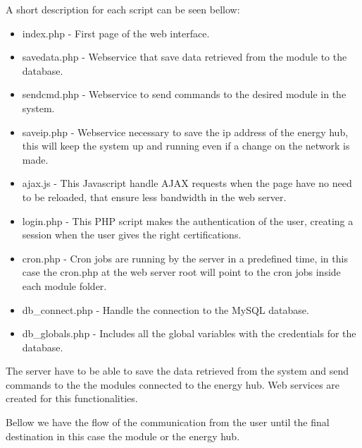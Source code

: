 A short description for each script can be seen bellow:
\begin{itemize}
	\item index.php - First page of the web interface.
	\item savedata.php - Webservice that save data retrieved from the module to the database.
	\item sendcmd.php - Webservice to send commands to the desired module in the system.
	\item saveip.php - Webservice necessary to save the ip address of the energy hub, this will keep the system up and running even if a change on the network is made.
	\item ajax.js - This Javascript handle AJAX requests when the page have no need to be reloaded, that ensure less bandwidth in the web server.
	\item login.php  - This PHP script makes the authentication of the user, creating a session when the user gives the right certifications.
	\item cron.php  - Cron jobs are running by the server in a predefined time, in this case the cron.php at the web server root will point to the cron jobs inside each module folder.
	\item db\_connect.php - Handle the connection to the MySQL database.
	\item db\_globals.php - Includes all the global variables with the credentials for the database.
\end{itemize}

The server have to be able to save the data retrieved from the system and send commands to the the modules connected to the energy hub. Web services are created for this functionalities.

Bellow we have the flow of the communication from the user until the final destination in this case the module or the energy hub.
\begin{figure}[H]
	\begin{centering}
	\end{centering}
\end{figure}

